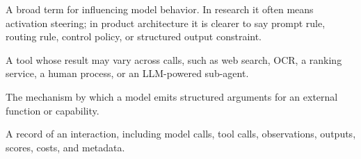 \begin{description}[leftmargin=*]
  \item[Steering.] A broad term for influencing model behavior. In research it often means activation steering; in product architecture it is clearer to say prompt rule, routing rule, control policy, or structured output constraint.
  \item[Stochastic tool.] A tool whose result may vary across calls, such as web search, OCR, a ranking service, a human process, or an LLM-powered sub-agent.
  \item[Tool calling.] The mechanism by which a model emits structured arguments for an external function or capability.
  \item[Trace.] A record of an interaction, including model calls, tool calls, observations, outputs, scores, costs, and metadata.
\end{description}
